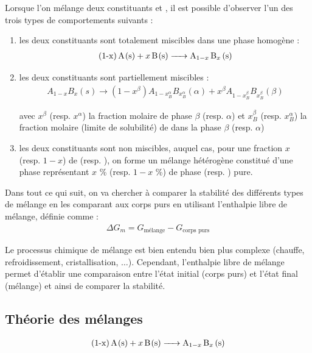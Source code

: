 \documentclass[a4paper]{book}
\begin{document}
Lorsque l'on mélange deux constituants  et , il est possible d'observer l'un des trois types de comportements suivants :
\begin{enumerate}
\item les deux constituants sont totalement miscibles dans une phase homogène :
\begin{align*}
\ce{(1-x) A(s) + x B(s) -> A_{1-x} B_x (s)}
\end{align*}
\item les deux constituants sont partiellement miscibles :
\begin{align*}
A_{1-x} B_x(s) \to (1-x^\beta) A_{1-x_B^\alpha}B_{x_B^\alpha} (\alpha) + x^\beta A_{1-x_B^\beta}B_{x_B^\beta} ( \beta )
\end{align*}

avec $x^\beta$ (resp. $x^\alpha$) la fraction molaire de phase $\beta$ (resp. $\alpha$) et $x_B^ \beta$ (resp. $x_B^\alpha$) la fraction molaire (limite de solubilité) de  dans la phase $\beta$ (resp. $\alpha$)
\item les deux constituants sont non miscibles, auquel cas, pour une fraction $x$ (resp. $1 - x$) de  (resp. ), on forme un mélange hétérogène constitué d'une phase représentant $x$ \si{\percent} (resp. $1 - x$ \si{\percent}) de phase  (resp. ) pure.
\end{enumerate}

Dans tout ce qui suit, on va chercher à comparer la stabilité des différents types de mélange en les comparant aux corps purs en utilisant l'enthalpie libre de mélange, définie comme : 
\begin{align*}
\Delta G_m = G_{\text{mélange}} - G_{\text{corps purs}}
\end{align*}

Le processus chimique de mélange est bien entendu bien plus complexe (chauffe, refroidissement, cristallisation, $\ldots$). Cependant, l'enthalpie libre de mélange permet d'établir une comparaison entre l'état initial (corps purs) et l'état final (mélange) et ainsi de comparer la stabilité.


\subsection{Théorie des mélanges}

\begin{align*}
\ce{(1-x) A(s) + x B(s) -> A_{1-x} B_x (s)}
\end{align*}
\end{document}
